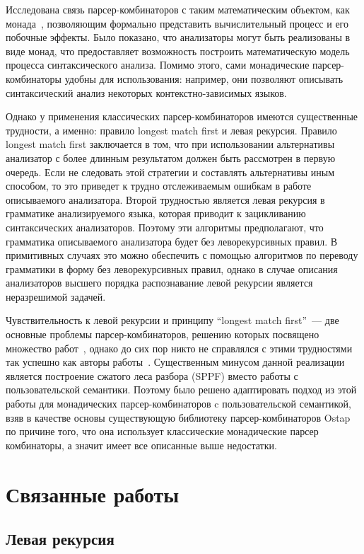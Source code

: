 \documentclass[conference]{IEEEtran}
\begin{document}
Исследована связь парсер-комбинаторов с таким математическим объектом, как монада~\cite{meijer,wadler}, позволяющим формально представить вычислительный процесс и его побочные эффекты. Было показано, что анализаторы могут быть реализованы в виде монад, что предоставляет возможность построить математическую модель процесса синтаксического анализа. Помимо этого, сами монадические парсер-комбинаторы удобны для использования: например, они позволяют описывать синтаксический анализ некоторых контекстно-зависимых языков.

Однако у применения классических парсер-комбинаторов имеются существенные трудности, а именно: правило longest match first и левая рекурсия. Правило longest match first заключается в том, что при использовании альтернативы анализатор с более длинным результатом должен быть рассмотрен в первую очередь. Если не следовать этой стратегии и составлять альтернативы иным способом, то это приведет к трудно отслеживаемым ошибкам в работе описываемого анализатора. Второй трудностью является левая рекурсия в грамматике анализируемого языка, которая приводит к зацикливанию синтаксических анализаторов. Поэтому эти алгоритмы предполагают, что грамматика описываемого анализатора будет без леворекурсивных правил. В примитивных случаях это можно обеспечить с помощью алгоритмов по переводу грамматики в форму без леворекурсивных правил, однако в случае описания анализаторов высшего порядка распознавание левой рекурсии является неразрешимой задачей.

Чувствительность к левой рекурсии и принципу ``longest match first''~--- две основные проблемы парсер-комбинаторов, решению которых посвящено множество работ~\cite{frost,tratt,warth}, однако до сих пор никто не справлялся с этими трудностями так успешно как авторы работы~\cite{meerkat}. Существенным минусом данной реализации является построение сжатого леса разбора (SPPF) вместо работы с пользовательской семантики. Поэтому было решено адаптировать подход из этой работы для монадических парсер-комбинаторов c пользовательской семантикой, взяв в качестве основы существующую библиотеку парсер-комбинаторов Ostap~\cite{ostap} по причине того, что она использует классические монадические парсер комбинаторы, а значит имеет все описанные выше недостатки.

\section{Связанные работы}

\subsection{Левая рекурсия}
\end{document}
